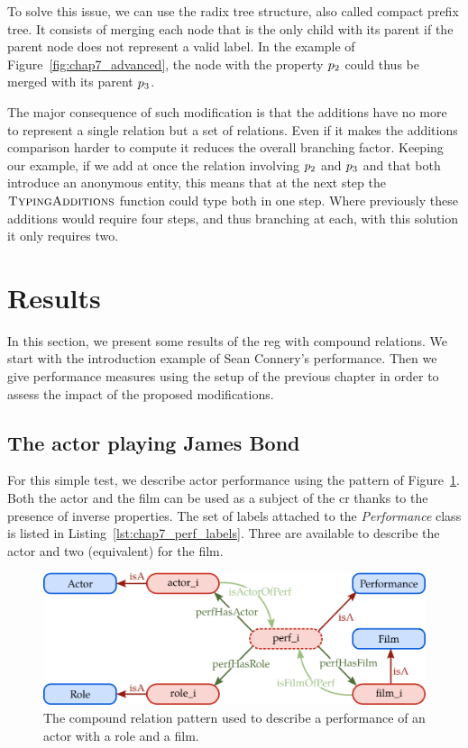 To solve this issue, we can use the radix tree structure, also called compact prefix tree. It consists of merging each node that is the only child with its parent if the parent node does not represent a valid label. In the example of Figure~\ref{fig:chap7_advanced}, the node with the property $p_2$ could thus be merged with its parent $p_3$.

The major consequence of such modification is that the additions have no more to represent a single relation but a set of relations. Even if it makes the additions comparison harder to compute it reduces the overall branching factor. Keeping our example, if we add at once the relation involving $p_2$ and $p_3$ and that both introduce an anonymous entity, this means that at the next step the $\textsc{TypingAdditions}$ function could type both in one step. Where previously these additions would require four steps, and thus branching at each, with this solution it only requires two.

\section{Results}

In this section, we present some results of the \acrshort{reg} with compound relations. We start with the introduction example of Sean Connery's performance. Then we give performance measures using the setup of the previous chapter in order to assess the impact of the proposed modifications. 

\subsection{The actor playing James Bond}

For this simple test, we describe actor performance using the pattern of Figure~\ref{fig:chap7_perf}. Both the actor and the film can be used as a subject of the \acrshort{cr} thanks to the presence of inverse properties. The set of labels attached to the \textit{Performance} class is listed in Listing~\ref{lst:chap7_perf_labels}. Three are available to describe the actor and two (equivalent) for the film.

\newpage

\begin{figure}[ht!]
\centering
\includegraphics[scale=0.4]{figures/chapter7/perf.png}
\caption{\label{fig:chap7_perf} The compound relation pattern used to describe a performance of an actor with a role and a film.}
\end{figure}

